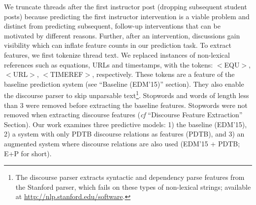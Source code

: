 \documentclass[letterpaper]{article}
\begin{document}
We truncate threads after the first instructor post (dropping
subsequent student posts) because predicting 
the first instructor intervention is a viable problem and distinct
from predicting subsequent, follow-up interventions that can be
motivated by different reasons.  Further, after an intervention,
discussions gain visibility which can
inflate feature counts in our prediction task. To extract features, 
we first tokenize thread text.  We replaced instances of non-lexical
references such as equations, URLs and timestamps, with the tokens:
$<$EQU$>$, $<$URL$>$, $<$TIMEREF$>$, respectively. These tokens are a
feature of the baseline prediction system (see ``Baseline (EDM'15)''
section). They also enable the discourse parser to skip unparsable
text\footnote{The discourse parser extracts syntactic and dependency
  parse features from the Stanford parser, which fails on these types
  of non-lexical strings; available at
  \url{http://nlp.stanford.edu/software}.}. Stopwords and words of
length less than 3 were removed before extracting the baseline
features. Stopwords were not removed when extracting discourse
features ({\it cf} ``Discourse Feature Extraction'' Section).
Our work examines three predictive models: 1) the baseline (EDM'15),
2) a system with only PDTB discourse relations as features (PDTB), and
3) an augmented system where discourse relations are also used (EDM'15
+ PDTB; E+P for short).
\end{document}
